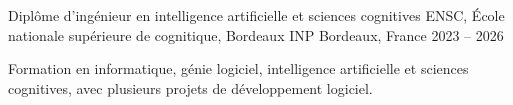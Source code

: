 
\begin{cventries}
  \cventry
    {Diplôme d’ingénieur en intelligence artificielle et sciences cognitives}
    {ENSC, École nationale supérieure de cognitique, Bordeaux INP}
    {Bordeaux, France}
    {2023 -- 2026}
    {
      \begin{cvitems}
        \item {Formation en informatique, génie logiciel, intelligence artificielle et sciences cognitives, avec plusieurs projets de développement logiciel.}
      \end{cvitems}
    }
\end{cventries}
